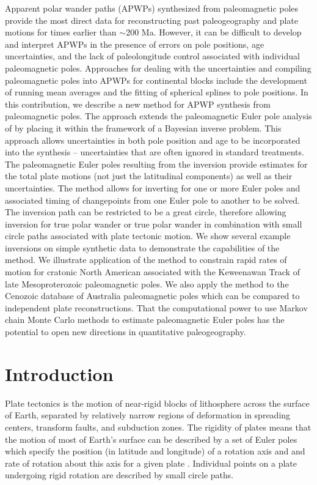 \documentclass[11pt,letterpaper]{article}
\begin{document}
Apparent polar wander paths (APWPs) synthesized from paleomagnetic poles provide the most direct data for reconstructing past paleogeography and plate motions for times earlier than $\sim$200 Ma. However, it can be difficult to develop and interpret APWPs in the presence of errors on pole positions, age uncertainties, and the lack of paleolongitude control associated with individual paleomagnetic poles. Approaches for dealing with the uncertainties and compiling paleomagnetic poles into APWPs for continental blocks include the development of running mean averages and the fitting of spherical splines to pole positions. In this contribution, we describe a new method for APWP synthesis from paleomagnetic poles. The approach extends the paleomagnetic Euler pole analysis of \cite{Gordon1984a} by placing it within the framework of a Bayesian inverse problem. This approach allows uncertainties in both pole position and age to be incorporated into the synthesis -- uncertainties that are often ignored in standard treatments. The paleomagnetic Euler poles resulting from the inversion provide estimates for the total plate motions (not just the latitudinal components) as well as their uncertainties. The method allows for inverting for one or more Euler poles and associated timing of changepoints from one Euler pole to another to be solved. The inversion path can be restricted to be a great circle, therefore allowing inversion for true polar wander or true polar wander in combination with small circle paths associated with plate tectonic motion. We show several example inversions on simple synthetic data to demonstrate the capabilities of the method. We illustrate application of the method to constrain rapid rates of motion for cratonic North American associated with the Keweenawan Track of late Mesoproterozoic paleomagnetic poles. We also apply the method to the Cenozoic database of Australia paleomagnetic poles which can be compared to independent plate reconstructions. That the computational power to use Markov chain Monte Carlo methods to estimate paleomagnetic Euler poles has the potential to open new directions in quantitative paleogeography.

\section*{Introduction}

Plate tectonics is the motion of near-rigid blocks of lithosphere across the surface of Earth, separated by relatively narrow regions of deformation in spreading centers, transform faults, and subduction zones. The rigidity of plates means that the motion of most of Earth's surface can be described by a set of Euler poles which specify the position (in latitude and longitude) of a rotation axis and and rate of rotation about this axis for a given plate \citep[cf.][]{Cox2009a}. Individual points on a plate undergoing rigid rotation are described by small circle paths.
\end{document}
